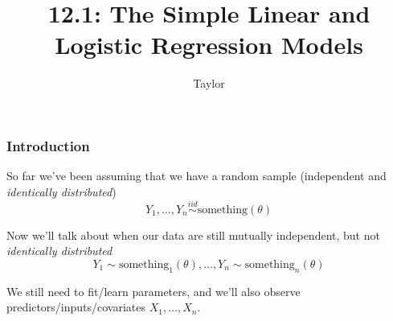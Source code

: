 \documentclass{beamer}
\title["12.1"]{12.1: The Simple Linear and Logistic Regression Models}
\author{Taylor}
\institute[UVA] 
{
University of Virginia \\
\medskip
\textit{} 
}
\date{}
\begin{document}

\begin{frame}
\titlepage 
\end{frame}
\begin{frame}
\frametitle{Introduction}

So far we've been assuming that we have a random sample (independent and \emph{identically distributed})
\[
Y_1, \ldots, Y_n \overset{iid}{\sim} \text{something}(\theta)
\]

\pause
Now we'll talk about when our data are still mutually independent, but not \emph{identically distributed}
\[
Y_1 \sim \text{something}_1(\theta), \ldots, Y_n \sim \text{something}_n(\theta)
\]
\pause

We still need to fit/learn parameters, and we'll also observe predictors/inputs/covariates $X_1, \ldots, X_n$.
\end{frame}
\end{document}
